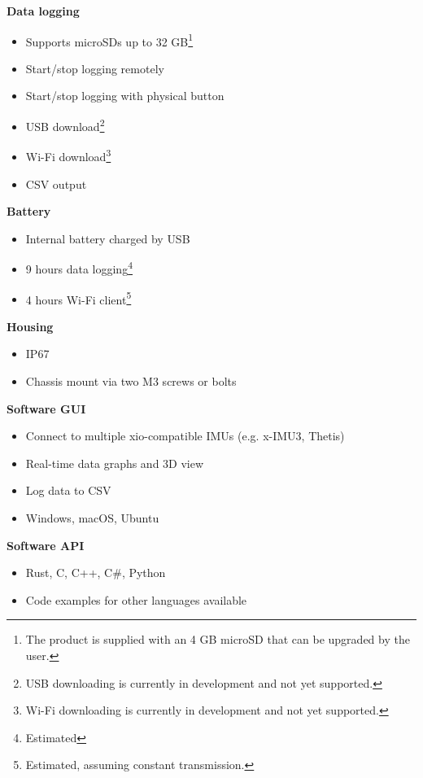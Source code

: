 \begin{multicols}{2}
\textbf{Data logging}
\begin{itemize}[nolistsep]
    \item Supports \acsp{microSD} up to 32 GB\footnote{The product is supplied with an 4 GB \acs{microSD} that can be upgraded by the user.}
    \item Start/stop logging remotely\footnotemark[\numexpr\value{footnote}-2\relax]
    \item Start/stop logging with physical button
    \item USB download\footnote{USB downloading is currently in development and not yet supported.}
    \item Wi-Fi download\footnote{Wi-Fi downloading is currently in development and not yet supported.}
    \item \acs{CSV} output
\end{itemize}

\textbf{Battery}
\begin{itemize}[nolistsep]
    \item Internal battery charged by \acs{USB}
    \item 9 hours data logging\footnote{Estimated}
    \item 4 hours Wi-Fi client\footnote{Estimated, assuming constant transmission.}
\end{itemize}

\textbf{Housing}
\begin{itemize}[nolistsep]
    \item \acs{IP67}
    \item Chassis mount via two M3 screws or bolts
\end{itemize}

\textbf{Software \acs{GUI}}
\begin{itemize}[nolistsep]
    \item Connect to multiple xio-compatible \acsp{IMU} (e.g. x-IMU3, Thetis)
    \item Real-time data graphs and 3D view
    \item Log data to \acs{CSV}
    \item Windows, macOS, Ubuntu
\end{itemize}

\textbf{Software \acs{API}}
\begin{itemize}[nolistsep]
    \item Rust, C, C++, C\#, Python
    \item Code examples for other languages available
\end{itemize}

\end{multicols}

\clearpage
